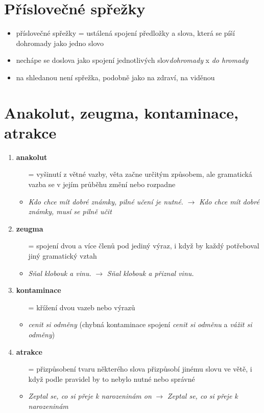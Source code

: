 \documentclass{memoir}
\begin{document}
\section*{Příslovečné spřežky}
	\begin{itemize}
		\item příslovečné spřežky = ustálená spojení předložky a slova, která se píší dohromady jako jedno slovo
		\item nechápe se doslova jako spojení jednotlivých slov\hfill\textit{dohromady} x \textit{do hromady}
		\item na shledanou není spřežka, podobně jako na zdraví, na viděnou
	\end{itemize}

\section*{Anakolut, zeugma, kontaminace, atrakce}
	\begin{enumerate}
		\item \textbf{anakolut}
		\begin{itemize}
			\item[=] vyšinutí z větné vazby, věta začne určitým způsobem, ale gramatická vazba se v jejím průběhu změní nebo rozpadne
			\item \textit{Kdo chce mít dobré známky, pilné učení je nutné.} $\rightarrow$ \textit{Kdo chce mít dobré známky, musí se pilně učit}
		\end{itemize}
		\item \textbf{zeugma}
		\begin{itemize}
			\item[=] spojení dvou a více členů pod jediný výraz, i když by každý potřeboval jiný gramatický vztah
			\item \textit{Sňal klobouk a vinu.} $\rightarrow$ \textit{Sňal klobouk a přiznal vinu.}
		\end{itemize}
		\item \textbf{kontaminace}
		\begin{itemize}
			\item[=] křížení dvou vazeb nebo výrazů
			\item \textit{cenit si odměny} (chybná kontaminace spojení \textit{cenit si odměnu} a \textit{vážit si odměny})
		\end{itemize}
		\item \textbf{atrakce}
		\begin{itemize}
			\item[=] přizpůsobení tvaru některého slova přizpůsobí jinému slovu ve větě, i když podle pravidel by to nebylo nutné nebo správné
			\item \textit{Zeptal se, co si přeje k narozeninám on} $\rightarrow$ \textit{Zeptal se, co si přeje k narozeninám}
		\end{itemize}
	\end{enumerate}
\end{document}
